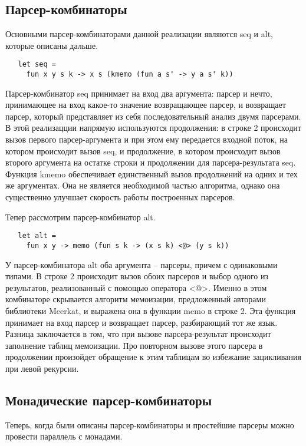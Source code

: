 \documentclass[conference]{IEEEtran}
\begin{document}
\subsection{Парсер-комбинаторы}
Основными парсер-комбинаторами данной реализации являются seq и alt, которые описаны дальше.

\begin{lstlisting}
   let seq =
     fun x y s k -> x s (kmemo (fun a s' -> y a s' k))
\end{lstlisting}

Парсер-комбинатор seq принимает на вход два аргумента: парсер и нечто, принимающее на вход какое-то значение возвращающее парсер, и возвращает парсер, который представляет из себя последовательный анализ двумя парсерами. В этой реализацции напрямую используются продолжения: в строке 2 происходит вызов первого парсер-аргумента и при этом ему передается входной поток, на котором происходит вызов seq, и продолжение, в котором происходит вызов второго аргумента на остатке строки и продолжении для парсера-результата seq. Функция kmemo обеспечивает единственный вызов продолжений на одних и тех же аргументах. Она не является необходимой частью алгоритма, однако она существенно улучшает скорость работы построенных парсеров.

Тепер рассмотрим парсер-комбинатор alt.

\begin{lstlisting}
   let alt =
     fun x y -> memo (fun s k -> (x s k) <@> (y s k))
\end{lstlisting}

У парсер-комбинатора alt оба аргумента -- парсеры, причем с одинаковыми типами. В строке 2 происходит вызов обоих парсеров и выбор одного из результатов, реализованный с помощью оператора <@>. Именно в этом комбинаторе скрывается алгоритм мемоизации, предложенный авторами библиотеки Meerkat, и выражена она в функции memo в строке 2. Эта функция принимает на вход парсер и возвращает парсер, разбирающий тот же язык. Разница заключается в том, что при вызове парсера-результат происходит заполнение таблиц мемоизации. Про повторном вызове этого парсера в продолжении произойдет обращение к этим таблицам во избежание зацикливания при левой рекурсии.

\subsection{Монадические парсер-комбинаторы}
Теперь, когда были описаны парсер-комбинаторы и простейшие парсеры можно провести параллель с монадами.
\end{document}
